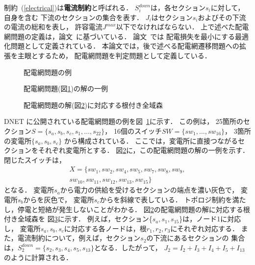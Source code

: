 制約~(\ref{electrical})は\textbf{電流制約}と呼ばれる．
$S_{i}^{down}$は，各セクション$s_{i}$に対して，自身を含む
下流のセクションの集合を表す．
$J_{i}$はセクション$s_{i}$およびその下流の電流の総和を表し，
許容電流$J^{max}$以下でなければならない．
%
上で述べた配電網問題の定義は，論文~\cite{Minato:dnet:ZDD}に基づいている．
論文~\cite{Minato:dnet:ZDD}では
配電損失を最小にする最適化問題として定義されている．
本論文では，後で述べる配電網遷移問題への拡張を主眼とするため，
配電網問題を判定問題として定義している．

\begin{figure}[tb]
 \centering
 \scalebox{0.5}{}
  \caption{配電網問題の例}
  \label{fig:test-input}
\end{figure}
%  
\begin{figure}[tb]
 \centering
 \scalebox{0.5}{}
 \caption{配電網問題(図\ref{fig:test-input})の解の一例}
 \label{fig:test-output}
\end{figure}

\begin{figure}[tbp]
  \centering
  \scalebox{0.7}{\hspace{2zw}}
  \caption{配電網問題の解(図\ref{fig:test-output})に対応する根付き全域森}
  \label{fig:test-netsuki-output}
\end{figure}  

DNET
に公開されている配電網問題の例を図~\ref{fig:test-input}に示す．
この例は，
25箇所のセクション$S=\{s_{a},s_{b},s_{c},s_{1},\ldots, s_{22}\}$，
16個のスイッチ$SW=\{sw_{1},\ldots, sw_{16}\}$，
3箇所の変電所$\{s_{a}, s_{b}, s_{c}\}$
から構成されている．
ここでは，変電所に直接つながるセクションをそれぞれ変電所とする．
%
図\ref{fig:test-output}に，この配電網問題の解の一例を示す．
閉じたスイッチは，
\begin{multline*}
 X=\{sw_{1},sw_{2},sw_{4},sw_{5},sw_{7},sw_{8},sw_{9}, \\
 sw_{10},sw_{11},sw_{12},sw_{13},sw_{15}\}  
\end{multline*}
となる．
変電所$s_{a}$から電力の供給を受けるセクションの端点を濃い灰色で，
変電所$s_{b}$からを灰色で，
変電所$s_{c}$からを斜線で表している．
トポロジ制約を満たし，停電と短絡が発生しないことがわかる．
図\ref{fig:test-output}の配電網問題の解に対応する根付き全域森を
図\ref{fig:test-netsuki-output}に示す．
例えば，セクション\{$s_a,s_1,s_{15}$\}は，ノード1に対応し，
変電所$s_a,s_b,s_c$に対応する各ノードは，根$r_1,r_2,r_3$にそれぞれ対応する．
また，電流制約について，例えば，セクション$s_2$の下流にあるセクションの
集合は，$S_2^{down}=\{s_{2},s_{3},s_{4},s_{5},s_{13}\}$となる．したがって，
$J_{2}=I_{2}+I_{3}+I_{4}+I_{5}+I_{13}$のように計算される．


